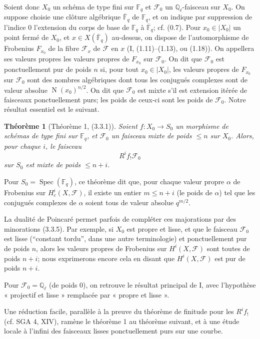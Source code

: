 \documentclass[11pt]{article}
\newtheorem{theorem}{Théorème}
\theoremstyle{remark}
\newcommand{\Ql}{\mathbb{Q}_\ell}
\newcommand{\Fq}{\mathbb{F}_q}
\newcommand{\Fbar}{\overline{\mathbb{F}}_q}
\newcommand{\Spec}{\operatorname{Spec}}
\newcommand{\Norm}{\operatorname{N}}
\begin{document}
Soient donc $X_0$ un schéma de type fini sur $\Fq$ et $\mathcal F_0$ un $\Ql$-faisceau sur $X_0$. On suppose choisie une clôture algébrique $\Fbar$ de $\Fq$, et on indique par suppression de l'indice $0$ l'extension du corps de base de $\Fq$ à $\Fbar$; cf. (0.7). Pour $x_0\in |X_0|$ un point fermé de $X_0$, et $x\in X(\Fbar)$ au-dessus, on dispose de l'automorphisme de Frobenius $F_{x_0}$ de la fibre $\mathcal F_x$ de $\mathcal F$ en $x$ (I, (1.11)--(1.13), ou (1.18)). On appellera ses valeurs propres les valeurs propres de $F_{x_0}$ sur $\mathcal F_0$. On dit que $\mathcal F_0$ est ponctuellement pur de poids $n$ si, pour tout $x_0\in |X_0|$, les valeurs propres de $F_{x_0}$ sur $\mathcal F_0$ sont des nombres algébriques dont tous les conjugués complexes sont de valeur absolue $\Norm(x_0)^{n/2}$. On dit que $\mathcal F_0$ est mixte s'il est extension itérée de faisceaux ponctuellement purs; les poids de ceux-ci sont les poids de $\mathcal F_0$. Notre résultat essentiel est le suivant.

\begin{theorem}[Théorème 1, (3.3.1)]
Soient $f:X_0\to S_0$ un morphisme de schémas de type fini sur $\Fq$, et $\mathcal F_0$ un faisceau mixte de poids $\le n$ sur $X_0$. Alors, pour chaque $i$, le faisceau
\[
R^i f_!\mathcal F_0
\]
sur $S_0$ est mixte de poids $\le n+i$.
\end{theorem}

Pour $S_0=\Spec(\Fq)$, ce théorème dit que, pour chaque valeur propre $\alpha$ de Frobenius sur $H^i_c(X,\mathcal F)$, il existe un entier $m\le n+i$ (le poids de $\alpha$) tel que les conjugués complexes de $\alpha$ soient tous de valeur absolue $q^{m/2}$.

La dualité de Poincaré permet parfois de compléter ces majorations par des minorations (3.3.5). Par exemple, si $X_0$ est propre et lisse, et que le faisceau $\mathcal F_0$ est lisse (``constant tordu'', dans une autre terminologie) et ponctuellement pur de poids $n$, alors les valeurs propres de Frobenius sur $H^i(X,\mathcal F)$ sont toutes de poids $n+i$; nous exprimerons encore cela en disant que $H^i(X,\mathcal F)$ est pur de poids $n+i$.

Pour $\mathcal F_0=\Ql$ (de poids $0$), on retrouve le résultat principal de I, avec l'hypothèse « projectif et lisse » remplacée par « propre et lisse ».

Une réduction facile, parallèle à la preuve du théorème de finitude pour les $R^i f_!$ (cf. SGA 4, XIV), ramène le théorème 1 au théorème suivant, et à une étude locale à l'infini des faisceaux lisses ponctuellement purs sur une courbe.
\end{document}
